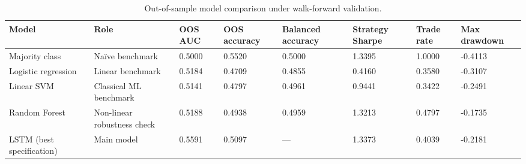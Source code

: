 \begin{table}
\caption{Out-of-sample model comparison under walk-forward validation.}
\label{tab:model_comparison}
\begin{tabular}{llllllll}
\toprule
Model & Role & OOS AUC & OOS accuracy & Balanced accuracy & Strategy Sharpe & Trade rate & Max drawdown \\
\midrule
Majority class & Naïve benchmark & 0.5000 & 0.5520 & 0.5000 & 1.3395 & 1.0000 & -0.4113 \\
Logistic regression & Linear benchmark & 0.5184 & 0.4709 & 0.4855 & 0.4160 & 0.3580 & -0.3107 \\
Linear SVM & Classical ML benchmark & 0.5141 & 0.4797 & 0.4961 & 0.9441 & 0.3422 & -0.2491 \\
Random Forest & Non-linear robustness check & 0.5188 & 0.4938 & 0.4959 & 1.3213 & 0.4797 & -0.1735 \\
LSTM (best specification) & Main model & 0.5591 & 0.5097 & — & 1.3373 & 0.4039 & -0.2181 \\
\bottomrule
\end{tabular}
\end{table}
